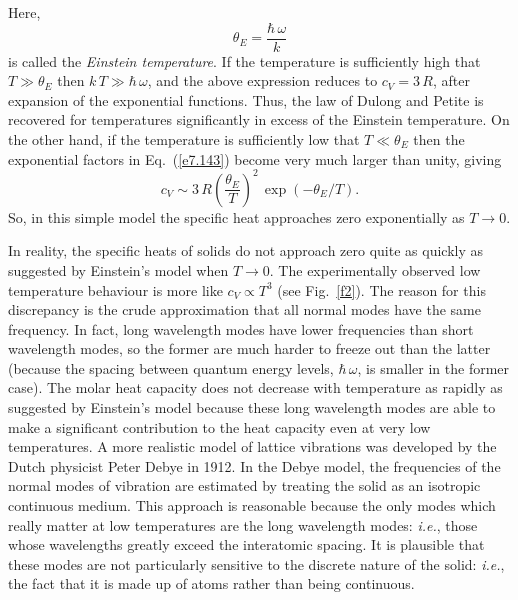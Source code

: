Here,
\begin{equation}
\theta_E = \frac{\hbar \,\omega}{k}
\end{equation}
is called the {\em Einstein temperature}. If the temperature is sufficiently
 high that
$T\gg \theta_E$ then $k\,T \gg \hbar \,\omega$, and the above expression reduces to
$c_V = 3\,R$, after expansion of the exponential functions. Thus, the law of Dulong and
Petite is recovered for temperatures significantly in excess of the Einstein temperature.
On the other hand, if the temperature is sufficiently
low that $T\ll \theta_E$ then the
exponential factors in Eq.~(\ref{e7.143}) become very much larger than unity, giving
\begin{equation}
c_V \sim 3 \,R \left(\frac{\theta_E}{T}\right)^2\,\exp(-\theta_E / T).
\end{equation}
So, in this simple model the specific heat approaches zero exponentially as $T\rightarrow 0$. 

In reality, the specific heats of solids do not approach zero quite as  quickly as 
suggested by Einstein's model when $T\rightarrow 0$. The experimentally observed low temperature
behaviour is more like $c_V \propto T^3$ (see Fig.~\ref{f2}). The reason for this discrepancy is the crude 
approximation
that all normal modes have the same frequency. In fact, long wavelength modes have lower frequencies
than short wavelength modes, so the former are much harder to freeze out than the latter
(because the spacing between quantum energy levels, $\hbar\,\omega$, is smaller in the former case). 
The molar 
heat capacity does not decrease with temperature as rapidly  as suggested by Einstein's model
because these long wavelength modes are able to make a significant contribution 
to the heat capacity even at very low
temperatures. A more realistic model of lattice vibrations was developed by the Dutch physicist 
Peter Debye in 1912. 
In the Debye model, the frequencies of the normal modes of vibration are estimated by treating
the solid as an isotropic continuous medium. This approach is reasonable because the only modes
which really matter at low temperatures are the long wavelength modes: {\em i.e.},  those whose
wavelengths greatly exceed the interatomic spacing. It is plausible that these modes are not
particularly 
sensitive to the discrete nature of the solid: {\em i.e.}, the fact that it is  made up of atoms
rather than being continuous. 

